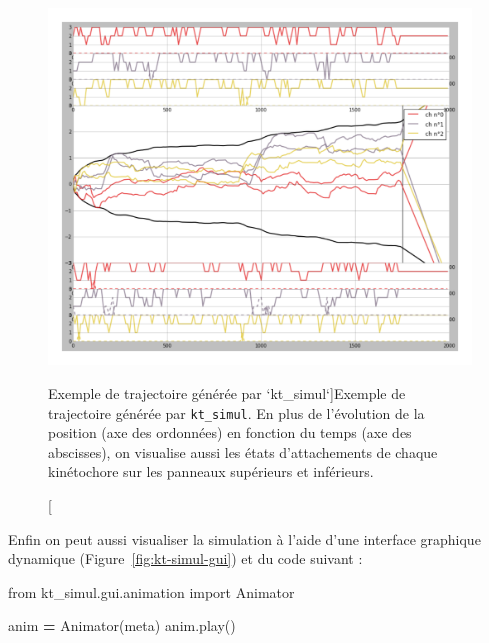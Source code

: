 \documentclass[12pt,a4paper,twoside,openright]{book}
\newenvironment{Shaded}{\begin{snugshade}}{\end{snugshade}}
\newcommand{\ImportTok}[1]{{#1}}
\newcommand{\OperatorTok}[1]{\textcolor[rgb]{0.81,0.36,0.00}{\textbf{{#1}}}}
\newcommand{\NormalTok}[1]{{#1}}
\begin{document}
\begin{figure}[htbp]
\centering
\includegraphics{figures/annexes/trajectories.png}
\caption[Exemple de trajectoire générée par `kt\_simul`]{\label{fig:kt-simul-traj}Exemple
de trajectoire générée par \texttt{kt\_simul}. En plus de l'évolution de
la position (axe des ordonnées) en fonction du temps (axe des
abscisses), on visualise aussi les états d'attachements de chaque
kinétochore sur les panneaux supérieurs et inférieurs.}
\end{figure}

Enfin on peut aussi visualiser la simulation à l'aide d'une interface
graphique dynamique (Figure~\ref{fig:kt-simul-gui}) et du code suivant :

\begin{Shaded}
\begin{Highlighting}[]
\ImportTok{from} \NormalTok{kt_simul.gui.animation }\ImportTok{import} \NormalTok{Animator}

\NormalTok{anim }\OperatorTok{=} \NormalTok{Animator(meta)}
\NormalTok{anim.play()}
\end{Highlighting}
\end{Shaded}
\end{document}
